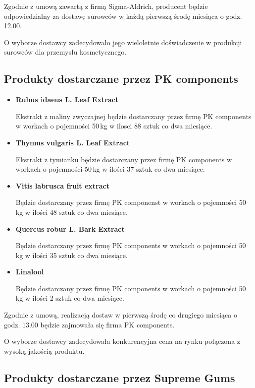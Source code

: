 	Zgodnie z umową zawartą z firmą \textsf{Sigma-Aldrich}, producent będzie odpowiedzialny za dostawę surowców w każdą pierwszą środę miesiąca o godz. 12.00.

	O wyborze dostawcy zadecydowało jego wieloletnie doświadczenie w produkcji surowców dla przemysłu kosmetycznego.

\subsection{Produkty dostarczane przez \textsf{PK components}}

\begin{itemize}
	\item \textbf{Rubus idaeus L. Leaf Extract}

	Ekstrakt z maliny zwyczajnej będzie dostarczany przez firmę \textsf{PK components} w workach o pojemności 50\,kg w ilosci 88 sztuk co dwa miesiące.
	\item \textbf{Thymus vulgaris L. Leaf Extract}

	Ekstrakt z tymianku będzie dostarczany przez firmę \textsf{PK components} w workach o pojemności 50\,kg w ilości 37 sztuk co dwa miesiące.
	\item \textbf{Vitis labrusca fruit extract }

	Będzie dostarczany przez firmę PK componenst w workach o pojemności 50\,kg w ilości 48 sztuk co dwa miesiące.
	\item \textbf{Quercus robur L. Bark Extract}

	Będzie dostarczany przez firmę \textsf{PK components} w workach o pojemności 50\,kg w ilości 35 sztuk co dwa miesiące.
	\item \textbf{Linalool}

	Będzie dostarczany przez firmę \textsf{PK components} w workach o pojemności 50\,kg w ilości 2 sztuk co dwa miesiące.
\end{itemize}\vspace{\baselineskip}

	Zgodnie z umową, realizacją dostaw w pierwszą środę co drugiego miesiąca o godz. 13.00 będzie zajmowała się firma \textsf{PK components}.

	O wyborze dostawcy zadecydowała konkurencyjna cena na rynku połączona z wysoką jakością produktu.

\subsection{Produkty dostarczane przez \textsf{Supreme Gums}}

